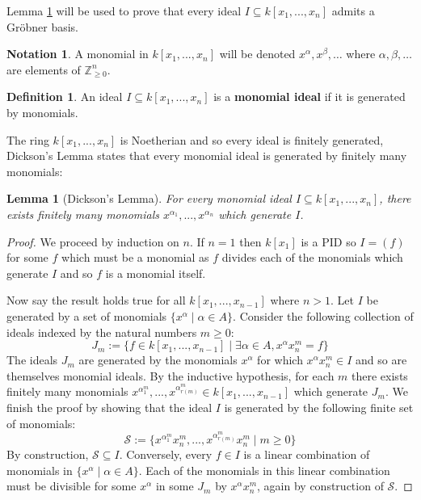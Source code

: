 \documentclass[12pt]{article}
\theoremstyle{plain}
\newtheorem{lemma}[thm]{Lemma}
\theoremstyle{definition}
\newtheorem{defn}[thm]{Definition} %
\newtheorem{notation}[thm]{Notation}
\newcommand{\bb}[1]{\mathbb{#1}}
\newcommand{\scr}[1]{\mathscr{#1}}
\begin{document}
Lemma \ref{lem:Dickson} will be used to prove that every ideal $I \subseteq k[x_1,...,x_n]$ admits a Gr\"{o}bner basis.
\begin{notation}
A monomial in $k[x_1,...,x_n]$ will be denoted $x^\alpha, x^\beta,\hdots$ where $\alpha,\beta,\hdots$ are elements of $\bb{Z}_{\geq 0}^n$.
\end{notation}
\begin{defn}
An ideal $I \subseteq k[x_1,...,x_n]$ is a \textbf{monomial ideal} if it is generated by monomials.
\end{defn}
The ring $k[x_1,...,x_n]$ is Noetherian and so every ideal is finitely generated, Dickson's Lemma states that every monomial ideal is generated by finitely many monomials:
\begin{lemma}[Dickson's Lemma]\label{lem:Dickson}
For every monomial ideal $I \subseteq k[x_1,...,x_n]$, there exists finitely many monomials $x^{\alpha_1},...,x^{\alpha_n}$ which generate $I$.
\end{lemma}
\begin{proof}
We proceed by induction on $n$. If $n = 1$ then $k[x_1]$ is a PID so $I = (f)$ for some $f$ which must be a monomial as $f$ divides each of the monomials which generate $I$ and so $f$ is a monomial itself.

Now say the result holds true for all $k[x_1,...,x_{n-1}]$ where $n > 1$. Let $I$ be generated by a set of monomials $\lbrace x^\alpha \mid \alpha \in A \rbrace$. Consider the following collection of ideals indexed by the natural numbers $m \geq 0$:
\begin{equation}
    J_m := \lbrace f \in k[x_1,...,x_{n-1}] \mid \exists \alpha \in A, x^\alpha x_n^{m} = f\rbrace
\end{equation}
The ideals $J_m$ are generated by the monomials $x^\alpha$ for which $x^\alpha x_{n}^m \in I$ and so are themselves monomial ideals. By the inductive hypothesis, for each $m$ there exists finitely many monomials $x^{\alpha_1^m},...,x^{\alpha_{r(m)}^m} \in k[x_1,...,x_{n-1}]$ which generate $J_m$. We finish the proof by showing that the ideal $I$ is generated by the following finite set of monomials:
\begin{equation}
\scr{S} := \lbrace x^{\alpha_1^m}x_n^m,...,x^{\alpha_{r(m)}^m}x_n^m \mid m \geq 0\rbrace
\end{equation}
By construction, $\scr{S} \subseteq I$. Conversely, every $f \in I$ is a linear combination of monomials in $\lbrace x^\alpha \mid \alpha \in A \rbrace$. Each of the monomials in this linear combination must be divisible for some $x^\alpha$ in some $J_m$ by $x^\alpha x_n^m$, again by construction of $\scr{S}$.
\end{proof}
\end{document}
